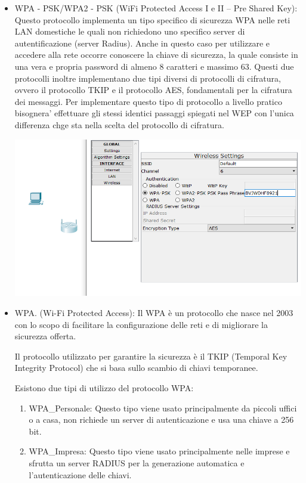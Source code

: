 \begin{itemize}
    \item WPA - PSK/WPA2 - PSK (WiFi Protected Access I e II – Pre Shared Key): Questo protocollo implementa un tipo specifico di sicurezza WPA nelle reti LAN domestiche le quali non richiedono uno specifico server di autentificazione (server Radius). Anche in questo caso per utilizzare e accedere alla rete occorre conoscere la chiave di sicurezza, la quale consiste in una vera e propria password di almeno 8 caratteri e massimo 63.  Questi due protocolli inoltre implementano due tipi diversi di protocolli di cifratura, ovvero il protocollo TKIP e il protocollo AES, fondamentali per la cifratura dei messaggi. Per implementare questo tipo di protocollo a livello pratico bisognera’ effettuare gli stessi identici passaggi spiegati nel WEP con l’unica differenza chge sta nella scelta del protocollo di cifratura.\par
    \begin{center}
        \includegraphics[width=\linewidth]{images/08.wireless/09.png}
    \end{center}

    \item WPA. (Wi-Fi Protected Access): Il WPA è un protocollo che nasce nel 2003 con lo scopo di facilitare la configurazione delle reti e di migliorare la sicurezza offerta.
    
    Il protocollo utilizzato per garantire la sicurezza è il TKIP (Temporal Key Integrity Protocol) che si basa sullo scambio di chiavi temporanee.

    Esistono due tipi di utilizzo del protocollo WPA:

    \begin{enumerate}
        \item WPA\_Personale: Questo tipo viene usato principalmente da piccoli uffici o a casa, non richiede un server di autenticazione e usa una chiave a 256 bit.
        \item WPA\_Impresa: Questo tipo viene usato principalmente nelle imprese e sfrutta un server RADIUS per la generazione automatica e l’autenticazione delle chiavi.
    \end{enumerate}
    

\end{itemize}
